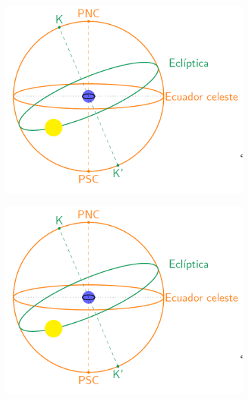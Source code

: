 \begin{figure}[h]
	\centering
	\begin{subfigure}{0.45\textwidth}
		\centering
		\includegraphics[width=1\textwidth]{Cuerpo/Imagenes/01_Ecliptica.png}
	\end{subfigure}
	\hfill
	\begin{subfigure}{0.45\textwidth}
		\centering
		\includegraphics[width=1\textwidth]{Cuerpo/Imagenes/01_Ecliptica.png}
	\end{subfigure}
\end{figure}




